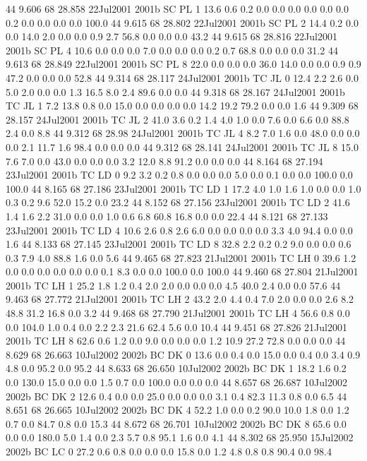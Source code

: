 44 9.606	68 28.858	22Jul2001	2001b	SC	PL	1	13.6	0.6	0.2	0.0	0.0	0.0	0.0	0.0	0.0	0.2	0.0	0.0	0.0	0.0	100.0
44 9.615	68 28.802	22Jul2001	2001b	SC	PL	2	14.4	0.2	0.0	0.0	14.0	2.0	0.0	0.0	0.9	2.7	56.8	0.0	0.0	0.0	43.2
44 9.615	68 28.816	22Jul2001	2001b	SC	PL	4	10.6	0.0	0.0	0.0	7.0	0.0	0.0	0.0	0.2	0.7	68.8	0.0	0.0	0.0	31.2
44 9.613	68 28.849	22Jul2001	2001b	SC	PL	8	22.0	0.0	0.0	0.0	36.0	14.0	0.0	0.0	0.9	0.9	47.2	0.0	0.0	0.0	52.8
44 9.314	68 28.117	24Jul2001	2001b	TC	JL	0	12.4	2.2	2.6	0.0	5.0	2.0	0.0	0.0	1.3	16.5	8.0	2.4	89.6	0.0	0.0
44 9.318	68 28.167	24Jul2001	2001b	TC	JL	1	7.2	13.8	0.8	0.0	15.0	0.0	0.0	0.0	0.0	14.2	19.2	79.2	0.0	0.0	1.6
44 9.309	68 28.157	24Jul2001	2001b	TC	JL	2	41.0	3.6	0.2	1.4	4.0	1.0	0.0	7.6	0.0	6.6	0.0	88.8	2.4	0.0	8.8
44 9.312	68 28.98	24Jul2001	2001b	TC	JL	4	8.2	7.0	1.6	0.0	48.0	0.0	0.0	0.0	2.1	11.7	1.6	98.4	0.0	0.0	0.0
44 9.312	68 28.141	24Jul2001	2001b	TC	JL	8	15.0	7.6	7.0	0.0	43.0	0.0	0.0	0.0	3.2	12.0	8.8	91.2	0.0	0.0	0.0
44 8.164	68 27.194	23Jul2001	2001b	TC	LD	0	9.2	3.2	0.2	0.8	0.0	0.0	0.0	5.0	0.0	0.1	0.0	0.0	100.0	0.0	100.0
44 8.165	68 27.186	23Jul2001	2001b	TC	LD	1	17.2	4.0	1.0	1.6	1.0	0.0	0.0	1.0	0.3	0.2	9.6	52.0	15.2	0.0	23.2
44 8.152	68 27.156	23Jul2001	2001b	TC	LD	2	41.6	1.4	1.6	2.2	31.0	0.0	0.0	1.0	0.6	6.8	60.8	16.8	0.0	0.0	22.4
44 8.121	68 27.133	23Jul2001	2001b	TC	LD	4	10.6	2.6	0.8	2.6	6.0	0.0	0.0	0.0	0.0	3.3	4.0	94.4	0.0	0.0	1.6
44 8.133	68 27.145	23Jul2001	2001b	TC	LD	8	32.8	2.2	0.2	0.2	9.0	0.0	0.0	0.6	0.3	7.9	4.0	88.8	1.6	0.0	5.6
44 9.465	68 27.823	21Jul2001	2001b	TC	LH	0	39.6	1.2	0.0	0.0	0.0	0.0	0.0	0.0	0.1	8.3	0.0	0.0	100.0	0.0	100.0
44 9.460	68 27.804	21Jul2001	2001b	TC	LH	1	25.2	1.8	1.2	0.4	2.0	2.0	0.0	0.0	0.0	4.5	40.0	2.4	0.0	0.0	57.6
44 9.463	68 27.772	21Jul2001	2001b	TC	LH	2	43.2	2.0	4.4	0.4	7.0	2.0	0.0	0.0	2.6	8.2	48.8	31.2	16.8	0.0	3.2
44 9.468	68 27.790	21Jul2001	2001b	TC	LH	4	56.6	0.8	0.0	0.0	104.0	1.0	0.4	0.0	2.2	2.3	21.6	62.4	5.6	0.0	10.4
44 9.451	68 27.826	21Jul2001	2001b	TC	LH	8	62.6	0.6	1.2	0.0	9.0	0.0	0.0	0.0	1.2	10.9	27.2	72.8	0.0	0.0	0.0
44 8.629	68 26.663	10Jul2002	2002b	BC	DK	0	13.6	0.0	0.4	0.0	15.0	0.0	0.4	0.0	3.4	0.9	4.8	0.0	95.2	0.0	95.2
44 8.633	68 26.650	10Jul2002	2002b	BC	DK	1	18.2	1.6	0.2	0.0	130.0	15.0	0.0	0.0	1.5	0.7	0.0	100.0	0.0	0.0	0.0
44 8.657	68 26.687	10Jul2002	2002b	BC	DK	2	12.6	0.4	0.0	0.0	25.0	0.0	0.0	0.0	3.1	0.4	82.3	11.3	0.8	0.0	6.5
44 8.651	68 26.665	10Jul2002	2002b	BC	DK	4	52.2	1.0	0.0	0.2	90.0	10.0	1.8	0.0	1.2	0.7	0.0	84.7	0.8	0.0	15.3
44 8.672	68 26.701	10Jul2002	2002b	BC	DK	8	65.6	0.0	0.0	0.0	180.0	5.0	1.4	0.0	2.3	5.7	0.8	95.1	1.6	0.0	4.1
44 8.302	68 25.950	15Jul2002	2002b	BC	LC	0	27.2	0.6	0.8	0.0	0.0	0.0	15.8	0.0	1.2	4.8	0.8	0.8	90.4	0.0	98.4
